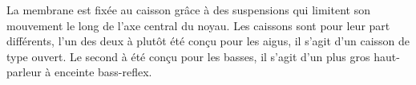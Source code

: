 La membrane est fixée au caisson grâce à des suspensions qui limitent son mouvement le long de l'axe central du noyau. Les caissons sont pour leur part différents, l'un des deux à plutôt été conçu pour les aigus, il s'agit d'un caisson de type ouvert. Le second à été conçu pour les basses, il s'agit d'un plus gros haut-parleur à enceinte bass-reflex. 




